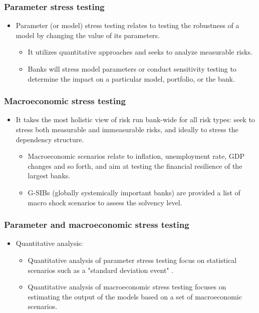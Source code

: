 \subsubsection{Parameter stress testing }
\begin{itemize}
\item Parameter (or model) stress testing relates to testing the robustness of a model by changing the value of its parameters.
    \begin{itemize}
    \item It utilizes quantitative approaches and seeks to analyze measurable risks.
    \item Banks will stress model parameters or conduct sensitivity testing to determine the impact on a particular model, portfolio, or the bank.
    \end{itemize}
    
\end{itemize}


\subsubsection{Macroeconomic stress testing}
\begin{itemize}
\item It takes the most holistic view of risk run bank-wide for all risk types: seek to stress both measurable and immeasurable risks, and ideally to stress the dependency structure.
    \begin{itemize}
    \item Macroeconomic scenarios relate to inflation,
    unemployment rate, GDP changes and so forth, and aim at testing the financial resilience of the largest banks.
    \item G-SIBs (globally systemically important banks) are provided a list of macro shock scenarios to assess the solvency level.
    \end{itemize}
\end{itemize}


\subsubsection{Parameter and macroeconomic stress testing}
\begin{itemize}
\item Quantitative analysis:
    \begin{itemize}
    \item Quantitative analysis of parameter stress testing focus on statistical scenarios such as a "standard deviation event" .
    \item Quantitative analysis of macroeconomic stress testing focuses on estimating the output of the models based on a set of macroeconomic scenarios.
    
    \end{itemize}
\end{itemize}


